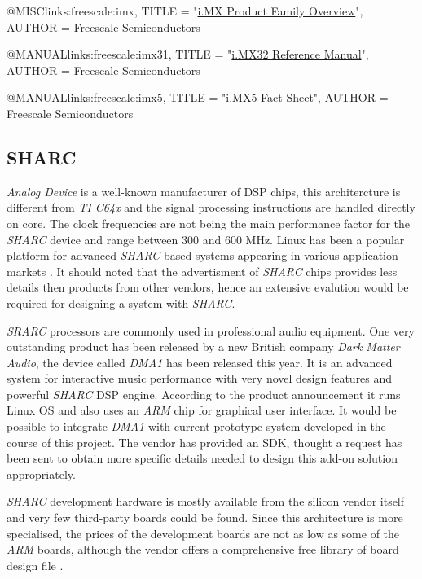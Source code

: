 @MISC{links:freescale:imx,
	TITLE = "\href{http://cache.freescale.com/files/32bit/doc/brochure/FLYRIMXPRDCMPR.pdf}
		{{i.MX Product Family Overview}}",
	AUTHOR = {{Freescale Semiconductors}}
}


@MANUAL{links:freescale:imx31,
	TITLE = "\href{http://www.freescale.com/files/32bit/doc/ref_manual/MCIMX31RM.pdf}
		{{i.MX32 Reference Manual}}",
	AUTHOR = {{Freescale Semiconductors}}
}

@MANUAL{links:freescale:imx5,
	TITLE = "\href{http://cache.freescale.com/files/32bit/doc/fact_sheet/IMX5CNFS.pdf}
		{{i.MX5 Fact Sheet}}",
	AUTHOR = {{Freescale Semiconductors}}
}


\subsection{SHARC}

  \emph{Analog Device} is a well-known manufacturer of DSP chips, this
 architercture is different from \emph{TI C64x} and the signal processing
 instructions are handled directly on core. The clock frequencies are
 not being the main performance factor for the \emph{SHARC} device and
 range between 300 and 600 MHz. Linux has been a popular platform for
 advanced \emph{SHARC}-based systems appearing in various application
 markets \cite{links:adi:sharc}. It should noted that the advertisment
 of \emph{SHARC} chips provides less details then products from other
 vendors, hence an extensive evalution would be required for designing
 a system with \emph{SHARC}.


  \emph{SRARC} processors are commonly used in professional audio
 equipment. One very outstanding product has been released by
 a new British company \emph{Dark Matter Audio}, the device called
 \emph{DMA1} \cite{links:dma1} has been released this year.
 It is an advanced system for interactive music performance with
 very novel design features and powerful \emph{SHARC} DSP engine.
 According to the product announcement it runs Linux OS and also
 uses an \emph{ARM} chip for graphical user interface. It would be
 possible to integrate \emph{DMA1} with current prototype system
 developed in the course of this project. The vendor has provided
 an SDK, thought a request has been sent to obtain more specific
 details needed to design this add-on solution appropriately.


  \emph{SHARC} development hardware is mostly available from the
 silicon vendor itself and very few third-party boards could be found.
 Since this architecture is more specialised, the prices of the 
 development boards are not as low as some of the \emph{ARM} boards,
 although the vendor offers a comprehensive free library of board
 design file \cite{links:adi:freepcb}.


